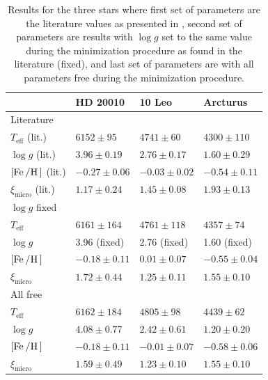 \begin{table}[htb!]
    \caption{Results for the three stars where first set of parameters are the literature values as
             presented in , second set of parameters are results with $\log g$ set
             to the same value during the minimization procedure as found in the literature (fixed),
             and last set of parameters are with all parameters free during the minimization
             procedure.}
    \label{tab:results}
    \centering
    \begin{tabular}{llll}
      \hline\hline
                                    & HD 20010          &  10 Leo           &  Arcturus        \\
      \hline
        Literature                  &                   &                   &                  \\
        $T_\mathrm{eff}$ (lit.)     & $6152 \pm  95  $  &  $4741 \pm  60  $ & $4300 \pm 110  $ \\
        $\log g$ (lit.)             & $3.96 \pm 0.19 $  &  $2.76 \pm 0.17 $ & $1.60 \pm 0.29 $ \\
        $[\ion{Fe}/\ion{H}]$ (lit.) & $-0.27 \pm 0.06$  &  $-0.03 \pm 0.02$ & $-0.54 \pm 0.11$ \\
        $\xi_\mathrm{micro}$ (lit.) & $1.17 \pm 0.24 $  &  $1.45 \pm 0.08 $ & $1.93 \pm 0.13 $ \\
      \hline
        $\log g$ fixed              &                   &                   &                  \\
        $T_\mathrm{eff}$            & $6161 \pm 164  $  &  $4761 \pm 118  $ & $4357 \pm  74  $ \\
        $\log g$                    & 3.96 (fixed)      &  2.76 (fixed)     & 1.60 (fixed)     \\
        $[\ion{Fe}/\ion{H}]$        & $-0.18 \pm 0.11$  &  $ 0.01 \pm 0.07$ & $-0.55 \pm 0.04$ \\
        $\xi_\mathrm{micro}$        & $1.72 \pm 0.44 $  &  $1.25 \pm 0.11 $ & $1.55 \pm 0.10 $ \\
      \hline
        All free                    &                   &                   &                  \\
        $T_\mathrm{eff}$            & $6162 \pm 184  $  &  $4805 \pm  98  $ & $4439 \pm  62  $ \\
        $\log g$                    & $4.08 \pm 0.77 $  &  $2.42 \pm 0.61 $ & $1.20 \pm 0.20 $ \\
        $[\ion{Fe}/\ion{H}]$        & $-0.18 \pm 0.11$  &  $-0.01 \pm 0.07$ & $-0.58 \pm 0.06$ \\
        $\xi_\mathrm{micro}$        & $1.59 \pm 0.49 $  &  $1.23 \pm 0.10 $ & $1.55 \pm 0.10 $ \\
        \hline\hline
    \end{tabular}
\end{table}




